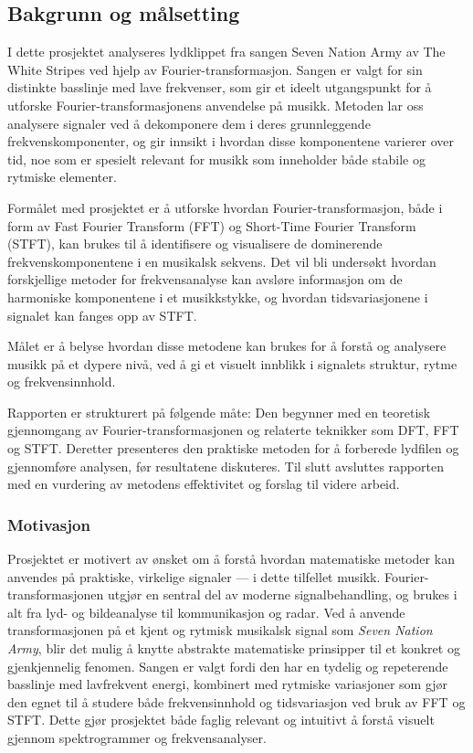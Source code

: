 

\subsection{Bakgrunn og målsetting}

I dette prosjektet analyseres lydklippet fra sangen Seven Nation Army av The White Stripes
 ved hjelp av Fourier-transformasjon. Sangen er valgt for sin distinkte basslinje med lave frekvenser, 
 som gir et ideelt utgangspunkt for å utforske Fourier-transformasjonens anvendelse på musikk. Metoden 
 lar oss analysere signaler ved å dekomponere dem i deres grunnleggende frekvenskomponenter, og gir 
 innsikt i hvordan disse komponentene varierer over tid, noe som er spesielt relevant for musikk som 
 inneholder både stabile og rytmiske elementer.

Formålet med prosjektet er å utforske hvordan Fourier-transformasjon, både i form av Fast Fourier Transform (FFT) 
og Short-Time Fourier Transform (STFT), kan brukes til å identifisere og visualisere de dominerende 
frekvenskomponentene i en musikalsk sekvens. Det vil bli undersøkt hvordan forskjellige metoder for 
frekvensanalyse kan avsløre informasjon om de harmoniske komponentene i et musikkstykke, og hvordan tidsvariasjonene 
i signalet kan fanges opp av STFT.

Målet er å belyse hvordan disse metodene kan brukes for å forstå og analysere musikk på et dypere nivå, 
ved å gi et visuelt innblikk i signalets struktur, rytme og frekvensinnhold.

Rapporten er strukturert på følgende måte: Den begynner med en teoretisk gjennomgang av Fourier-transformasjonen og 
relaterte teknikker som DFT, FFT og STFT. Deretter presenteres den praktiske metoden for å forberede lydfilen og 
gjennomføre analysen, før resultatene diskuteres. Til slutt avsluttes rapporten med en vurdering av metodens 
effektivitet og forslag til videre arbeid.

\subsubsection{Motivasjon}
Prosjektet er motivert av ønsket om å forstå hvordan matematiske metoder kan anvendes på praktiske, virkelige signaler 
— i dette tilfellet musikk. Fourier-transformasjonen utgjør en sentral del av moderne signalbehandling, og brukes i alt 
fra lyd- og bildeanalyse til kommunikasjon og radar. Ved å anvende transformasjonen på et kjent og rytmisk musikalsk signal 
som \textit{Seven Nation Army}, blir det mulig å knytte abstrakte matematiske prinsipper til et konkret og gjenkjennelig fenomen.
Sangen er valgt fordi den har en tydelig og repeterende basslinje med lavfrekvent energi, kombinert med rytmiske variasjoner som 
gjør den egnet til å studere både frekvensinnhold og tidsvariasjon ved bruk av FFT og STFT. Dette gjør prosjektet både faglig 
relevant og intuitivt å forstå visuelt gjennom spektrogrammer og frekvensanalyser.

